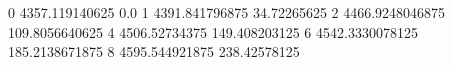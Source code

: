 0 4357.119140625 0.0
1 4391.841796875 34.72265625
2 4466.9248046875 109.8056640625
4 4506.52734375 149.408203125
6 4542.3330078125 185.2138671875
8 4595.544921875 238.42578125
